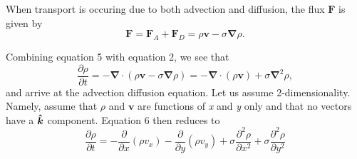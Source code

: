 \documentclass[12pt]{article}
\newcommand{\del}{\mbox{\boldmath $\nabla$}}
\def\del{\nabla}
\def\vec{\boldsymbol}
\newcommand{\uvk}{\mbox{\boldmath $\hat{k}$}}
\begin{document}
When transport is occuring due to both advection and diffusion, the flux $\vec{F}$ is given by
\begin{equation}
\vec{F} = \vec{F}_A + \vec{F}_D = \rho\vec{v}-\sigma\vec{\del}\rho .
\end{equation}

Combining equation 5 with equation 2, we see that
\begin{equation}
\frac{\partial\rho}{\partial t} = -\vec{\del}\cdot\left( \rho\vec{v}-\sigma\vec{\del}\rho \right)= -\vec{\del}\cdot(\rho\vec{v})+\sigma\vec{\del}^2\rho, 
\end{equation}
and arrive at the advection diffusion equation.  Let us assume 2-dimensionality.  Namely, assume that $\rho$ and $\vec{v}$ are functions of \textit{x} and \textit{y} only and that no vectors have a $\uvk$ component.  Equation 6 then reduces to
\begin{equation}
\frac{\partial\rho}{\partial t} = -\frac{\partial}{\partial x}(\rho v_x) -\frac{\partial}{\partial y}(\rho v_y)+\sigma\frac{\partial^2\rho}{\partial x^2} +\sigma\frac{\partial^2\rho}{\partial y^2}
\end{equation}
\end{document}
